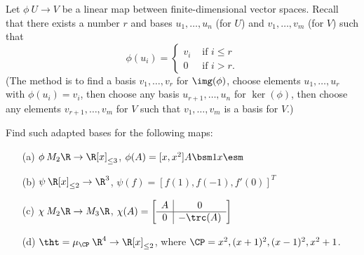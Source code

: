 \begin{exercise}\label{ex-adapted-bases}
 Let $\phi\:U\to V$ be a linear map between
 finite-dimensional vector spaces.  Recall that there exists
 a number $r$ and bases $u_1,\dotsc,u_n$ (for $U$) and
 $v_1,\dotsc,v_m$ (for $V$) such that
 \[ \phi(u_i) = \begin{cases}
     v_i & \text{ if } i \leq r \\
     0   & \text{ if } i > r.
    \end{cases}
 \]
 (The method is to find a basis $v_1,\dotsc,v_r$ for
 $\img(\phi)$, choose elements $u_1,\dotsc,u_r$ with
 $\phi(u_i)=v_i$, then choose any basis $u_{r+1},\dotsc,u_n$
 for $\ker(\phi)$, then choose any elements
 $v_{r+1},\dotsc,v_m$ for $V$ such that $v_1,\dotsc,v_m$ is
 a basis for $V$.)

 Find such adapted bases for the following maps:
 \begin{itemize}
  \item[(a)] $\phi\:M_2\R\to\R[x]_{\leq 3}$,
   $\phi(A)=[x, x^2]A\bsm 1\\ x\esm$
  \item[(b)] $\psi\:\R[x]_{\leq 2}\to\R^3$,
   $\psi(f)=[f(1),f(-1),f'(0)]^T$
  \item[(c)] $\chi\:M_2\R\to M_3\R$,
   $\chi(A)=\left[\begin{array}{c|c} 
    A & 0 \\ \hline 0 & -\trc(A) \end{array}\right]$
  \item[(d)] $\tht=\mu_\CP\:\R^4\to\R[x]_{\leq 2}$,
   where $\CP=x^2,(x+1)^2,(x-1)^2,x^2+1$.
 \end{itemize}
\end{exercise}
